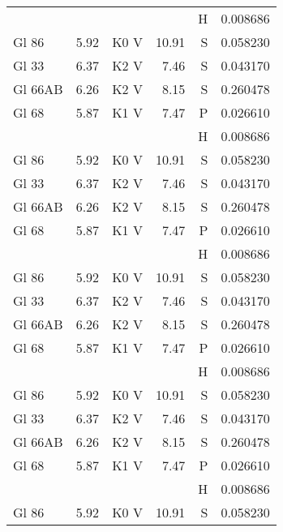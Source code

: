 \documentclass{aa}
\begin{document}
{\begin{landscape}
\begin{longtable}{lllrrr}
         &      &      &      & H & 0.008686\\
Gl 86    & 5.92 & K0 V & 10.91& S & 0.058230\\   Gl 33    & 6.37 & K2 V & 7.46 & S & 0.043170\\
Gl 66AB  & 6.26 & K2 V & 8.15 & S & 0.260478\\
Gl 68    & 5.87 & K1 V & 7.47 & P & 0.026610\\
         &      &      &      & H & 0.008686\\
Gl 86    & 5.92 & K0 V & 10.91& S & 0.058230\\   Gl 33    & 6.37 & K2 V & 7.46 & S & 0.043170\\
Gl 66AB  & 6.26 & K2 V & 8.15 & S & 0.260478\\
Gl 68    & 5.87 & K1 V & 7.47 & P & 0.026610\\
         &      &      &      & H & 0.008686\\
Gl 86    & 5.92 & K0 V & 10.91& S & 0.058230\\   Gl 33    & 6.37 & K2 V & 7.46 & S & 0.043170\\
Gl 66AB  & 6.26 & K2 V & 8.15 & S & 0.260478\\
Gl 68    & 5.87 & K1 V & 7.47 & P & 0.026610\\
         &      &      &      & H & 0.008686\\
Gl 86    & 5.92 & K0 V & 10.91& S & 0.058230\\   Gl 33    & 6.37 & K2 V & 7.46 & S & 0.043170\\
Gl 66AB  & 6.26 & K2 V & 8.15 & S & 0.260478\\
Gl 68    & 5.87 & K1 V & 7.47 & P & 0.026610\\
         &      &      &      & H & 0.008686\\
Gl 86    & 5.92 & K0 V & 10.91& S & 0.058230\\   
\end{longtable}
\end{landscape}
}
\end{document}
